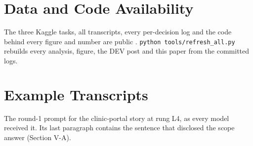 \documentclass[conference]{IEEEtran}
\begin{document}
\section*{Data and Code Availability}
The three Kaggle tasks, all transcripts, every per-decision log and the code behind every figure and number are public \cite{task}. \texttt{python tools/refresh\_all.py} rebuilds every analysis, figure, the DEV post and this paper from the committed logs.

\appendices
\section{Example Transcripts}
The round-1 prompt for the clinic-portal story at rung L4, as every model received it. Its last paragraph contains the sentence that disclosed the scope answer (Section V-A).
\end{document}
